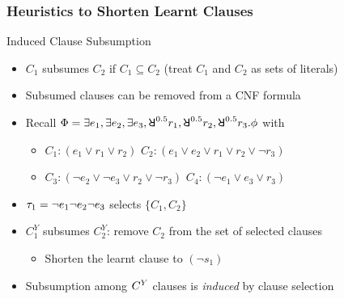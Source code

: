 \begin{frame}
    \frametitle{Heuristics to Shorten Learnt Clauses}
    \begin{block}{Induced Clause Subsumption}
        \begin{itemize}
            \item $C_1$ subsumes $C_2$ if $C_1 \subseteq C_2$ (treat $C_1$ and $C_2$ as sets of literals)
                  \pause
            \item Subsumed clauses can be removed from a CNF formula
                  \pause
            \item Recall $\Qf=\exists e_1,\exists e_2,\exists e_3,\random{0.5} r_1,\random{0.5} r_2,\random{0.5} r_3.\pf$ with
                  \begin{itemize}
                      \item[] $C_1: (e_1 \lor r_1 \lor r_2)$ $C_2: (e_1 \lor e_2 \lor r_1 \lor r_2 \lor \lnot r_3)$
                      \item[] $C_3: (\lnot e_2 \lor \lnot e_3 \lor r_2 \lor \lnot r_3)$ $C_4: (\lnot e_1 \lor e_3 \lor r_3)$
                  \end{itemize}
                  \pause
            \item $\tau_1=\lnot e_1 \lnot e_2 \lnot e_3$ selects $\{C_1,C_2\}$
                  \pause
            \item $C_1^Y$ subsumes $C_2^Y$: remove $C_2$ from the set of selected clauses
                  \pause
                  \begin{itemize}
                      \item Shorten the learnt clause to $(\lnot s_1)$
                            \pause
                  \end{itemize}
            \item Subsumption among $C^Y$ clauses is \textit{induced} by clause selection
        \end{itemize}
    \end{block}
\end{frame}

